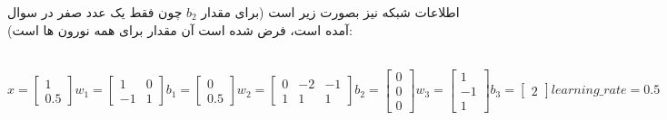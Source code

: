 اطلاعات شبکه نیز بصورت زیر است (برای مقدار $b_2$ چون فقط یک عدد صفر در سوال آمده است، فرض شده است آن مقدار برای همه نورون ها است):
\begin{latin}
	~\\
	$
	x = \begin{bmatrix}
			1 \\
			0.5 
		\end{bmatrix}
	w_1 = \begin{bmatrix}
		1 & 0  \\
		-1 & 1 
	\end{bmatrix}
	b_1 = \begin{bmatrix}
		0 \\
		0.5
	\end{bmatrix}
	w_2 = \begin{bmatrix}
		0 & -2 & -1 \\
		1 & 1 & 1
	\end{bmatrix}
	b_2 = \begin{bmatrix}
		0 \\
		0 \\
		0
	\end{bmatrix}
	w_3 = \begin{bmatrix}
		1 \\
		-1 \\
		1
	\end{bmatrix}
	b_3 = \begin{bmatrix}
		2
	\end{bmatrix}
	learning\_rate = 0.5
	$
\end{latin}
